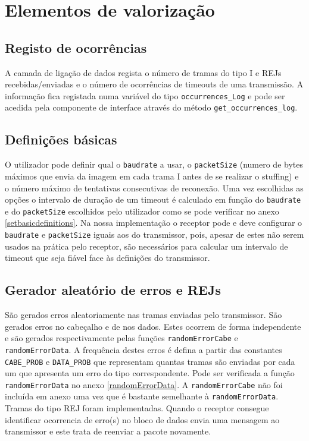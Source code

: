 \documentclass[11pt,a4paper,reqno]{report}
\numberwithin{equation}{section}
\begin{document}
\chapter{Elementos de valorização}

\section{Registo de ocorrências}

A camada de ligação de dados regista o número de tramas do tipo I e REJs recebidas/enviadas e o número de ocorrências de timeouts de uma transmissão. A informação fica registada numa variável do tipo \verb|occurrences_Log| e pode ser acedida pela componente de interface através do método \verb|get_occurrences_log|.

\section{Definições básicas}

O utilizador pode definir qual o \verb|baudrate| a usar, o \verb|packetSize| (numero de bytes máximos que envia da imagem em cada trama I antes de se realizar o stuffing) e o número máximo de tentativas consecutivas de reconexão.
Uma vez escolhidas as opções o intervalo de duração de um timeout é calculado em função do \verb|baudrate| e do \verb|packetSize| escolhidos pelo utilizador como se pode verificar no anexo \ref{setbasicdefinitions}. Na nossa implementação o receptor pode e deve configurar o \verb|baudrate| e \verb|packetSize| iguais aos do transmissor, pois, apesar de estes não serem usados na prática pelo receptor, são necessários para calcular um intervalo de timeout que seja fiável face às definições do transmissor.

\section{Gerador aleatório de erros e REJs}
São gerados erros aleatoriamente nas tramas enviadas pelo transmissor. São gerados erros no cabeçalho e de nos dados. Estes ocorrem de forma independente e são gerados respectivamente pelas funções \verb|randomErrorCabe| e \verb|randomErrorData|. A frequência destes erros é defina a partir das constantes \verb|CABE_PROB| e \verb|DATA_PROB| que representam quantas tramas são enviadas por cada um que apresenta um erro do tipo correspondente. Pode ser verificada a função \verb|randomErrorData| no anexo \ref{randomErrorData}. A \verb|randomErrorCabe| não foi incluída em anexo uma vez que é bastante semelhante à \verb|randomErrorData|.
Tramas do tipo REJ foram implementadas. Quando o receptor consegue identificar ocorrencia de erro(s) no bloco de dados envia uma mensagem ao transmissor e este trata de reenviar a pacote novamente.
\end{document}
